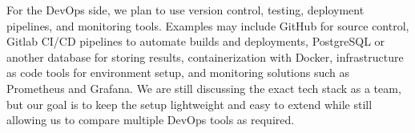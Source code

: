 For the DevOps side, we plan to use version control, testing, deployment pipelines, and monitoring tools. Examples may include GitHub for source control, Gitlab CI/CD pipelines to automate builds and deployments, PostgreSQL or another database for storing results, containerization with Docker, infrastructure as code tools for environment setup, and monitoring solutions such as Prometheus and Grafana. We are still discussing the exact tech stack as a team, but our goal is to keep the setup lightweight and easy to extend while still allowing us to compare multiple DevOps tools as required.

